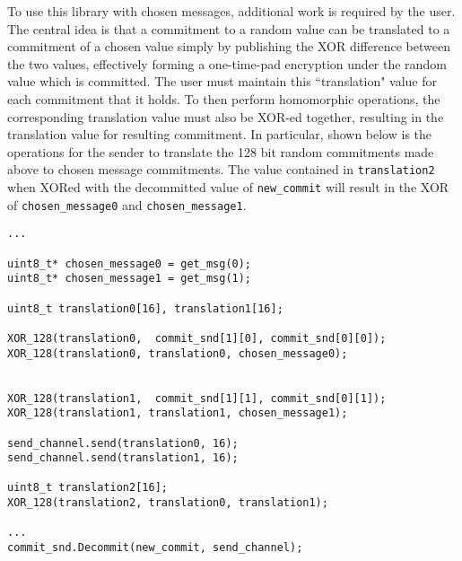 To use this library with chosen messages, additional work is required by the user. The central idea is that a commitment to a random value can be translated to a commitment of a chosen value simply by publishing the XOR difference between the two values, effectively forming a one-time-pad encryption under the random value which is committed. The user must maintain this ``translation" value for each commitment that it holds. To then perform homomorphic operations, the corresponding translation value must also be XOR-ed together, resulting in the translation value for resulting commitment. In particular, shown below is the operations for the sender to translate the 128 bit random commitments made above to chosen message commitments. The value contained in \texttt{translation2} when XORed with the decommitted value of \texttt{new\_commit} will result in the XOR of \texttt{chosen\_message0} and \texttt{chosen\_message1}.
\begin{lstlisting}     
...

uint8_t* chosen_message0 = get_msg(0);
uint8_t* chosen_message1 = get_msg(1);

uint8_t translation0[16], translation1[16];

XOR_128(translation0,  commit_snd[1][0], commit_snd[0][0]);
XOR_128(translation0, translation0, chosen_message0);


XOR_128(translation1,  commit_snd[1][1], commit_snd[0][1]);
XOR_128(translation1, translation1, chosen_message1);

send_channel.send(translation0, 16);
send_channel.send(translation1, 16);

uint8_t translation2[16];
XOR_128(translation2, translation0, translation1);

...
commit_snd.Decommit(new_commit, send_channel);
\end{lstlisting}

